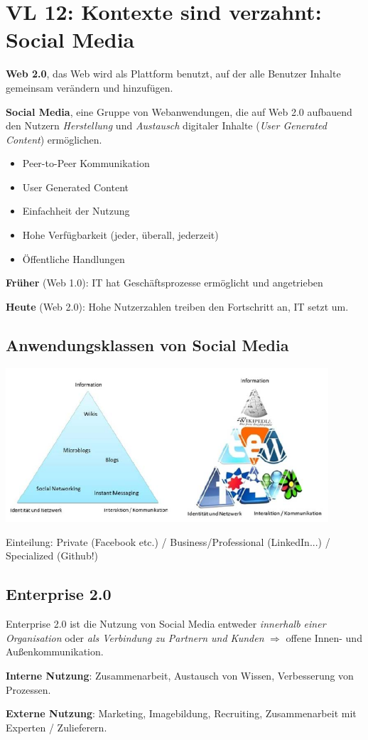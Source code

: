 \section{VL 12: Kontexte sind verzahnt: Social Media}

\textbf{Web 2.0}, das Web wird als Plattform benutzt, auf der alle Benutzer Inhalte
gemeinsam verändern und hinzufügen.

\textbf{Social Media}, eine Gruppe von Webanwendungen, die auf Web 2.0 aufbauend
den Nutzern \emph{Herstellung} und \emph{Austausch} digitaler Inhalte (\emph{User
Generated Content}) ermöglichen.

\begin{itemize}
\item Peer-to-Peer Kommunikation
\item User Generated Content
\item Einfachheit der Nutzung
\item Hohe Verfügbarkeit (jeder, überall, jederzeit)
\item Öffentliche Handlungen
\end{itemize}

\textbf{Früher} (Web 1.0): IT hat Geschäftsprozesse ermöglicht und angetrieben

\textbf{Heute} (Web 2.0): Hohe Nutzerzahlen treiben den Fortschritt an, IT setzt um.

\subsection{Anwendungsklassen von Social Media}

\includegraphics[width=0.9\textwidth]{anwendungsklassen.png}

Einteilung: Private (Facebook etc.) / Business/Professional (LinkedIn...) / Specialized (Github!)

\subsection{Enterprise 2.0}

Enterprise 2.0 ist die Nutzung von Social Media entweder \emph{innerhalb einer
Organisation} oder \emph{als Verbindung zu Partnern und Kunden} $\Rightarrow$ offene
Innen- und Außenkommunikation.

\textbf{Interne Nutzung}: Zusammenarbeit, Austausch von Wissen, Verbesserung von Prozessen.

\textbf{Externe Nutzung}: Marketing, Imagebildung, Recruiting, Zusammenarbeit mit Experten / Zulieferern.
\newpage
